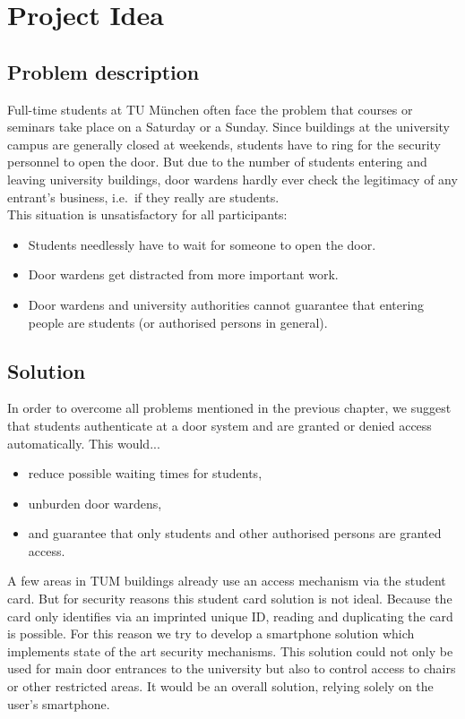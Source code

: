 \section{Project Idea}


\subsection{Problem description}

Full-time students at TU München often face the problem that courses or seminars take place on a Saturday or a Sunday.
Since buildings at the university campus are generally closed at weekends, students have to ring for the security personnel to open the door. But due to the number of students entering and leaving university buildings, door wardens hardly ever check the legitimacy of any entrant's business, i.e.~if they really are students.\\
This situation is unsatisfactory for all participants:

\begin{itemize}
\item Students needlessly have to wait for someone to open the door.
\item Door wardens get distracted from more important work.
\item Door wardens and university authorities cannot guarantee that entering people are students (or authorised persons in general).
\end{itemize}

\subsection{Solution}

In order to overcome all problems mentioned in the previous chapter, we suggest that students authenticate at a door system and are granted or denied access automatically. This would...

\begin{itemize}
\item reduce possible waiting times for students,
\item unburden door wardens,
\item and guarantee that only students and other authorised persons are granted access.
\end{itemize}

A few areas in TUM buildings already use an access mechanism via the student card.
But for security reasons this student card solution is not ideal.
Because the card only identifies via an imprinted unique ID, reading and duplicating the card is possible.
For this reason we try to develop a smartphone solution which implements state of the art security mechanisms.
This solution could not only be used for main door entrances to the university but also to control access to chairs or other restricted areas. It would be an overall solution, relying solely on the user's smartphone.
 
